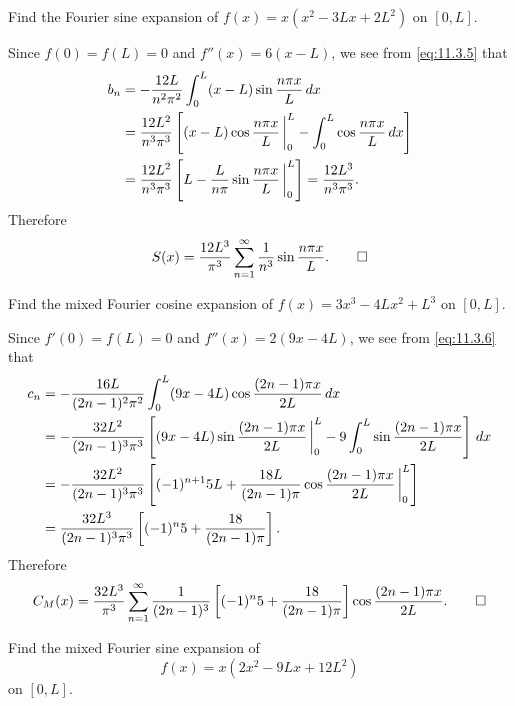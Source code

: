 \begin{example}\label{example:11.3.6}
Find the Fourier sine expansion of
$f(x)=x(x^2-3Lx+2L^2)$
on $[0,L]$.
\end{example}

\begin{solution}
Since $f(0)=f(L)=0$ and $f''(x)=6(x-L)$, we see from \eqref{eq:11.3.5}
that
\begin{align*}
b_n&=-\frac{12L}{n^2\pi^2}\int_0^L(x-L)\sin\frac{n\pi x}{L}\,dx\\
&=\frac{12L^2}{n^3\pi^3}\left[(x-L)\cos\frac{n\pi x}{L}\,\bigg|_{0}^{L}
-\int_0^L\cos\frac{n\pi x}{L}\,dx\right]\\
&=\frac{12L^2}{n^3\pi^3}\left[L-\frac{L}{n\pi}\sin\frac{n\pi
x}{L}\,\bigg|_{0}^{L}\right]
=\frac{12L^3}{n^3\pi^3}.
\end{align*}
Therefore
\[
S(x)=\frac{12L^3}{\pi^3}\sum_{n=1}^\infty\frac{1}{n^3}
\sin\frac{n\pi x}{L}.\qedhere
\]
\end{solution}

\begin{example}\label{example:11.3.7}
Find  the mixed Fourier cosine expansion of
$f(x)=3x^3-4Lx^2+L^3$
on $[0,L]$.
\end{example}

\begin{solution}
Since $f'(0)=f(L)=0$ and $f''(x)=2(9x-4L)$, we see from \eqref{eq:11.3.6}
that
\begin{align*}
c_n&=
-\frac{16L}{(2n-1)^2\pi^2}
\int_0^L(9x-4L)\cos\frac{(2n-1)\pi x}{2L}\,dx\\
&=-\frac{32L^2}{(2n-1)^3\pi^3}\left[(9x-4L)\sin\frac{(2n-1)\pi x}{2L}
\,\bigg|_{0}^{L}-9\int_0^L\sin\frac{(2n-1)\pi x}{2L}\right]\,dx\\
&=-\frac{32L^2}{(2n-1)^3\pi^3}
\left[(-1)^{n+1}5L+\frac{18L}{(2n-1)\pi}\cos\frac{(2n-1)\pi x}{2L}
\,\bigg|_{0}^{L}\right] \\
&=\frac{32L^3}{(2n-1)^3\pi^3}
\left[(-1)^n5+\frac{18}{(2n-1)\pi}\right].
\end{align*}
Therefore
\[
C_M(x)=\frac{32L^3}{\pi^3}\sum_{n=1}^\infty\frac{1}{(2n-1)^3}\left[
(-1)^n5+\frac{18}{(2n-1)\pi}\right]\cos\frac{(2n-1)\pi
x}{2L}.\qedhere
\]
\end{solution}

\begin{example}\label{example:11.3.8}
Find  the mixed Fourier  sine expansion of
\[
f(x)=x(2x^2-9Lx+12L^2)
\]
on $[0,L]$.
\end{example}

